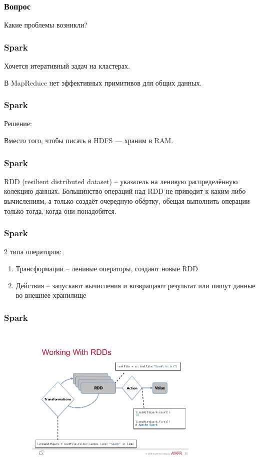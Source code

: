 \documentclass[12pt]{beamer}
\begin{document}
\begin{frame}\frametitle{Вопрос}
Какие проблемы возникли?
\end{frame}

\begin{frame}\frametitle{Spark}
Хочется итеративный задач на кластерах.

В MapReduce нет эффективных примитивов для общих данных.
\end{frame}


\begin{frame}\frametitle{Spark}
Решение:

Вместо того, чтобы писать в HDFS — храним в RAM.
\end{frame}

\begin{frame}\frametitle{Spark}
RDD (resilient distributed dataset) -- указатель на ленивую распределённую колекцию данных. Большинство операций над RDD не приводит к каким-либо вычислениям, а только создаёт очередную обёртку, обещая выполнить операции только тогда, когда они понадобятся.
\end{frame}


\begin{frame}\frametitle{Spark}
2 типа операторов:
\begin{enumerate}[--]
\item Трансформации -- ленивые операторы, создают новые RDD
\item Действия -- запускают вычисления и возвращают результат или пишут данные во внешнее хранилище
\end{enumerate}
\end{frame}

\begin{frame}\frametitle{Spark}

\begin{figure}[htbp]
  \includegraphics[height=200pt, keepaspectratio = true]{images/apache-spark-hadoop-39-638}   
\end{figure}
\end{frame}
\end{document}
